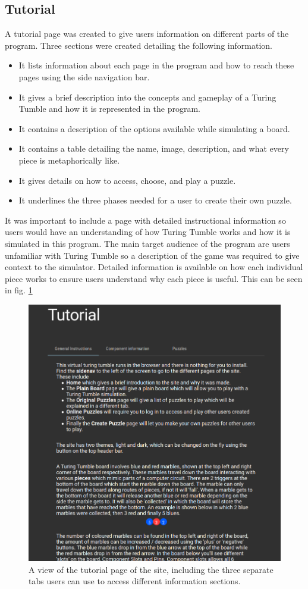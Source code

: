 \documentclass{l4proj}
\begin{document}
\subsection{Tutorial}
A tutorial page was created to give users information on different parts of the program. Three sections were created detailing the following information.
\begin{itemize}
    \item It lists information about each page in the program and how to reach these pages using the side navigation bar.
    \item It gives a brief description into the concepts and gameplay of a Turing Tumble and how it is represented in the program.
    \item It contains a description of the options available while simulating a board.
    \item It contains a table detailing the name, image, description, and what every piece is metaphorically like.
    \item It gives details on how to access, choose, and play a puzzle.
    \item It underlines the three phases needed for a user to create their own puzzle.
\end{itemize}

It was important to include a page with detailed instructional information so users would have an understanding of how Turing Tumble works and how it is simulated in this program. The main target audience of the program are users unfamiliar with Turing Tumble so a description of the game was required to give context to the simulator. Detailed information is available on how each individual piece works to ensure users understand why each piece is useful. This can be seen in fig. \ref{fig:tutorial}

\begin{figure}
    \centering
    \includegraphics[width=0.65\linewidth]{images/tutorial.png}
    \caption{A view of the tutorial page of the site, including the three separate tabs users can use to access different information sections.}
    \label{fig:tutorial}
\end{figure}
\end{document}
